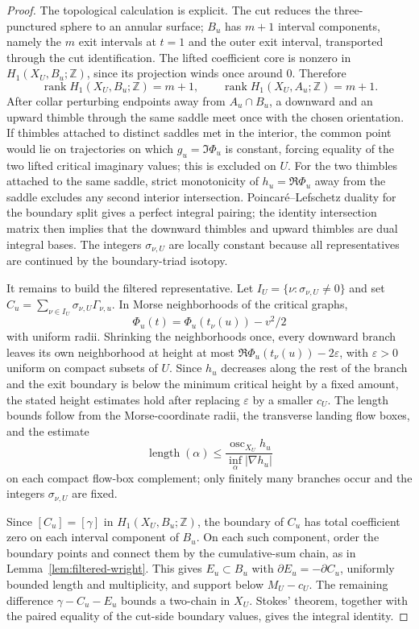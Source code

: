 \documentclass[reqno]{article}
\theoremstyle{definition}
\theoremstyle{remark}
\theoremstyle{plain}
\begin{document}
\begin{proof}
The topological calculation is explicit. The cut reduces the three-punctured sphere to an annular surface; \(B_u\) has \(m+1\) interval components, namely the \(m\) exit intervals at \(t=1\) and the outer exit interval, transported through the cut identification. The lifted coefficient core is nonzero in \(H_1(X_U,B_u;\mathbb Z)\), since its projection winds once around \(0\). Therefore
\[
\operatorname{rank}H_1(X_U,B_u;\mathbb Z)=m+1,
\qquad
\operatorname{rank}H_1(X_U,A_u;\mathbb Z)=m+1.
\]
After collar perturbing endpoints away from \(A_u\cap B_u\), a downward and an upward thimble through the same saddle meet once with the chosen orientation. If thimbles attached to distinct saddles met in the interior, the common point would lie on trajectories on which \(g_u=\Im\Phi_u\) is constant, forcing equality of the two lifted critical imaginary values; this is excluded on \(U\). For the two thimbles attached to the same saddle, strict monotonicity of \(h_u=\Re\Phi_u\) away from the saddle excludes any second interior intersection. Poincar\'e--Lefschetz duality for the boundary split gives a perfect integral pairing; the identity intersection matrix then implies that the downward thimbles and upward thimbles are dual integral bases. The integers \(\sigma_{\nu,U}\) are locally constant because all representatives are continued by the boundary-triad isotopy.

It remains to build the filtered representative. Let \(I_U=\{\nu:\sigma_{\nu,U}\ne0\}\) and set \(C_u=\sum_{\nu\in I_U}\sigma_{\nu,U}\Gamma_{\nu,u}\). In Morse neighborhoods of the critical graphs,
\[
\Phi_u(t)=\Phi_u(t_\nu(u))-v^2/2
\]
with uniform radii. Shrinking the neighborhoods once, every downward branch leaves its own neighborhood at height at most \(\Re\Phi_u(t_\nu(u))-2\varepsilon\), with \(\varepsilon>0\) uniform on compact subsets of \(U\). Since \(h_u\) decreases along the rest of the branch and the exit boundary is below the minimum critical height by a fixed amount, the stated height estimates hold after replacing \(\varepsilon\) by a smaller \(c_U\). The length bounds follow from the Morse-coordinate radii, the transverse landing flow boxes, and the estimate
\[
\operatorname{length}(\alpha)\le
\frac{\operatorname{osc}_{X_U}h_u}{\inf_\alpha|\nabla h_u|}
\]
on each compact flow-box complement; only finitely many branches occur and the integers \(\sigma_{\nu,U}\) are fixed.

Since \([C_u]=[\gamma]\) in \(H_1(X_U,B_u;\mathbb Z)\), the boundary of \(C_u\) has total coefficient zero on each interval component of \(B_u\). On each such component, order the boundary points and connect them by the cumulative-sum chain, as in Lemma~\ref{lem:filtered-wright}. This gives \(E_u\subset B_u\) with \(\partial E_u=-\partial C_u\), uniformly bounded length and multiplicity, and support below \(M_U-c_U\). The remaining difference \(\gamma-C_u-E_u\) bounds a two-chain in \(X_U\). Stokes' theorem, together with the paired equality of the cut-side boundary values, gives the integral identity.
\end{proof}
\end{document}
